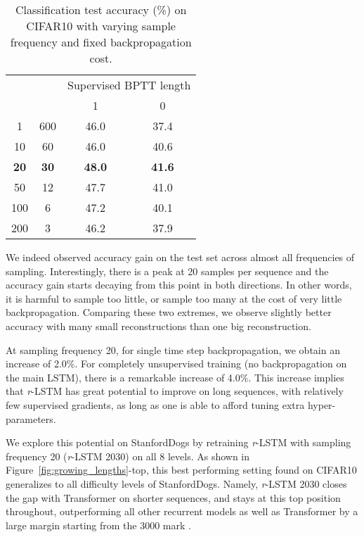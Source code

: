 \documentclass{article}
\newcommand{\rlstm}{{\it r}-LSTM}
\begin{document}
\begin{table}[htb]
\caption{Classification test accuracy (\%) on CIFAR10 with varying sample frequency and fixed backpropagation cost.}
\label{tab:sample_rate}
\vskip 0.15in
\begin{center}
\begin{small}

\begin{tabular}{cccc}
\toprule
 & & \multicolumn{2}{c}{Supervised BPTT length} \\
\cmidrule(lr){3-4}
 &  & 1 & 0 \\
\midrule
1 & 600 & 46.0 & 37.4 \\
10 & 60     & 46.0 & 40.6  \\
\textbf{20} & \textbf{30}  &  \textbf{48.0} & \textbf{41.6}  \\
50 & 12  &  47.7 & 41.0  \\
100 & 6 & 47.2 & 40.1  \\
200 & 3 &   46.2 & 37.9 \\
\bottomrule
\end{tabular}
\end{small}
\end{center}
\vskip -0.1in
\end{table}


We indeed observed accuracy gain on the test set across almost all frequencies of sampling. Interestingly, there is a peak at 20 samples per sequence and the accuracy gain starts decaying from this point in both directions. In other words, it is harmful to sample too little, or sample too many at the cost of very little backpropagation. Comparing these two extremes, we observe slightly better accuracy with many small reconstructions than one big reconstruction. 

At sampling frequency 20, for single time step backpropagation, we obtain an increase of 2.0\%. For completely unsupervised training (no backpropagation on the main LSTM), there is a remarkable increase of 4.0\%. This increase implies that \rlstm{} has great potential to improve on long sequences, with relatively few supervised gradients, as long as one is able to afford tuning extra hyper-parameters.

We explore this potential on StanfordDogs by retraining \rlstm{} with sampling frequency 20 (\rlstm{} 2030) on all 8 levels. As shown in Figure~\ref{fig:growing_lengths}-top, this best performing setting found on CIFAR10 generalizes to all difficulty levels of StanfordDogs. Namely, \rlstm{} 2030 closes the gap with Transformer on shorter sequences, and stays at this top position throughout, outperforming all other recurrent models as well as Transformer by a large margin starting from the 3000 mark .
\end{document}
